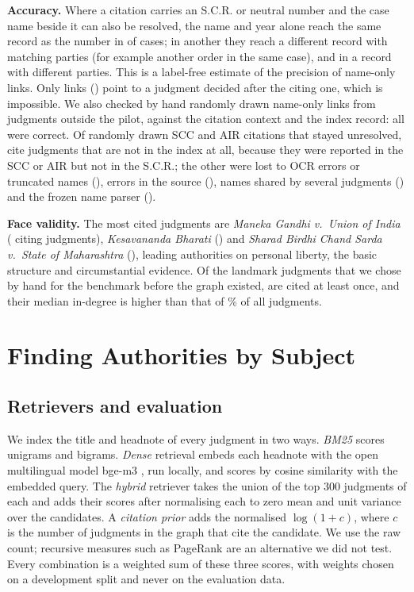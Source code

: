 \documentclass[conference]{IEEEtran}
\begin{document}
\textbf{Accuracy.} Where a citation carries an S.C.R. or neutral number and the case name beside it can also be resolved, the name and year alone reach the same record as the number in \GraphNameSamePct{} of \GraphNamePrecN{} cases; in another \GraphNameLoosePct{} they reach a different record with matching parties (for example another order in the same case), and in \GraphNameWrongPct{} a record with different parties. This is a label-free estimate of the precision of name-only links. Only \GraphLater{} links (\GraphLaterPct) point to a judgment decided after the citing one, which is impossible. We also checked by hand \GraphCheckN{} randomly drawn name-only links from judgments outside the pilot, against the citation context and the index record: all \GraphCheckOK{} were correct. Of \UnresN{} randomly drawn SCC and AIR citations that stayed unresolved, \UnresNotIndex{} cite judgments that are not in the index at all, because they were reported in the SCC or AIR but not in the S.C.R.; the other \UnresInIndex{} were lost to OCR errors or truncated names (\UnresExtraction), errors in the source (\UnresSource), names shared by several judgments (\UnresAmbig) and the frozen name parser (\UnresVerifier).

\textbf{Face validity.} The most cited judgments are \emph{Maneka Gandhi v.\ Union of India} (\GraphTopOneN{} citing judgments), \emph{Kesavananda Bharati} (\GraphTopTwoN) and \emph{Sharad Birdhi Chand Sarda v.\ State of Maharashtra} (\GraphTopThreeN), leading authorities on personal liberty, the basic structure and circumstantial evidence. Of the \GraphLandmarkN{} landmark judgments that we chose by hand for the benchmark before the graph existed, \GraphLandmarkCited{} are cited at least once, and their median in-degree is higher than that of \GraphLandmarkPct\% of all judgments.

\section{Finding Authorities by Subject}
\label{sec:retrieval}
\subsection{Retrievers and evaluation}
We index the title and headnote of every judgment in two ways. \emph{BM25} \cite{robertson2009} scores unigrams and bigrams. \emph{Dense} retrieval embeds each headnote with the open multilingual model bge-m3 \cite{chen2024m3}, run locally, and scores by cosine similarity with the embedded query. The \emph{hybrid} retriever takes the union of the top 300 judgments of each and adds their scores after normalising each to zero mean and unit variance over the candidates. A \emph{citation prior} adds the normalised $\log(1+c)$, where $c$ is the number of judgments in the graph that cite the candidate. We use the raw count; recursive measures such as PageRank \cite{page1999} are an alternative we did not test. Every combination is a weighted sum of these three scores, with weights chosen on a development split and never on the evaluation data.
\end{document}
